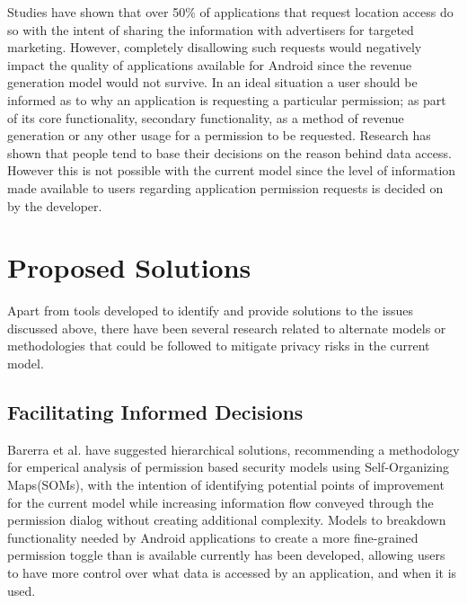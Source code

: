 Studies have shown that over 50\% of applications that request location access do so with the intent of sharing the information with advertisers for targeted marketing\cite{saint201050}. However, completely disallowing such requests would negatively impact the quality of applications available for Android since the revenue generation model would not survive. \cite{aa} In an ideal situation a user should be informed as to why an application is requesting a particular permission; as part of its core functionality, secondary functionality, as a method of revenue generation or any other usage for a permission to be requested. Research has shown that people tend to base their decisions on the reason behind data access\cite{lin2014modeling}. However this is not possible with the current model since the level of information made available to users regarding application permission requests is decided on by the developer.

\section{Proposed Solutions}
Apart from tools developed to identify and provide solutions to the issues discussed above, there have been several research related to alternate models or methodologies that could be followed to mitigate privacy risks in the current model.

\subsection{Facilitating Informed Decisions}
Barerra et al. have suggested hierarchical solutions, recommending a methodology for emperical analysis of permission based security models using Self-Organizing Maps(SOMs), with the intention of identifying potential points of improvement for the current model while increasing information flow conveyed through the permission dialog without creating additional complexity\cite{barrera2010methodology}. Models to breakdown functionality needed by Android applications to create a more fine-grained permission toggle than is available currently has been developed, allowing users to have more control over what data is accessed by an application, and when it is used\cite{bugiel2013flexible}. 
\smallskip

